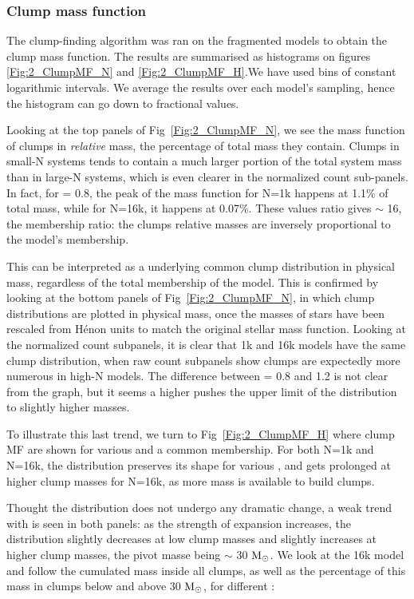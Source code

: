 \subsubsection*{Clump mass function}
 The clump-finding algorithm was ran on the fragmented models to obtain the clump mass function. The results are summarised as histograms on figures \ref{Fig:2_ClumpMF_N} and \ref{Fig:2_ClumpMF_H}.We have used bins of constant logarithmic intervals. We average the results over each model's sampling, hence the histogram can go down to fractional values.
 
 Looking at the top panels of Fig~\ref{Fig:2_ClumpMF_N}, we see the mass function of clumps in \textit{relative} mass, the percentage of total mass they contain.  Clumps in small-N systems tends to contain a much larger portion of the total system mass than in large-N systems, which is even clearer in the normalized count sub-panels. In fact, for \tHub = 0.8, the peak of the mass function for N=1k happens at 1.1\% of total mass, while for N=16k, it happens at 0.07\%. These values ratio gives $\sim$ 16, the membership ratio: the clumps relative masses are inversely proportional to the model's membership.
 
This can be interpreted as a underlying common clump distribution in physical mass, regardless of the total membership of the model. This is confirmed by looking at the bottom panels of Fig~\ref{Fig:2_ClumpMF_N}, in which clump distributions are plotted in physical mass, once the masses of stars have been rescaled from H\'enon units to match the original stellar mass function. Looking at the normalized count subpanels, it is clear that 1k and 16k models have the same clump distribution, when raw count subpanels show clumps are expectedly more numerous in high-N models. The difference between \tHub = 0.8 and 1.2 is not clear from the graph, but it seems a higher \tHub pushes the upper limit of the distribution to slightly higher masses.

To illustrate this last trend, we turn to Fig~\ref{Fig:2_ClumpMF_H} where clump MF are shown for various \tHub and a common membership. For  both N=1k and N=16k, the distribution preserves its shape for various \tHub, and gets prolonged at higher clump masses for N=16k, as more mass is available to build clumps.

 Thought the distribution does not undergo any dramatic change, a weak trend with \tHub is seen in both panels: as the strength of expansion increases, the distribution slightly decreases at low clump masses and slightly increases at higher clump masses, the pivot masse being $\sim$ 30 ${\textrm{M}_\odot}$. We look at the 16k model and follow the cumulated mass inside all clumps, as well as the percentage of this mass in clumps below and above 30 ${\textrm{M}_\odot}$, for different \tHub:

